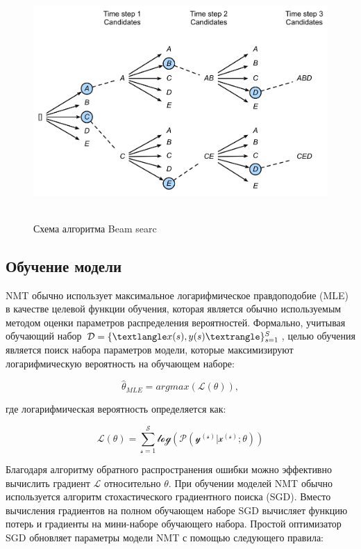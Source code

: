 	\begin{figure}[ht!]
		\centering
		\captionsetup{justification=centering}
		\includegraphics[height=90mm]{img/beam-search.png}
		\caption{Схема алгоритма Beam searc}
	\end{figure}
	
	
	\subsection{Обучение модели}
	
	NMT обычно использует максимальное логарифмическое правдоподобие (MLE) в качестве целевой функции обучения, которая является обычно используемым методом оценки параметров распределения вероятностей. Формально, учитывая обучающий набор $ \mathcal{D} = \{\textlangle x(s), y(s) \textrangle\}_{s=1}^S $, целью обучения является поиск набора параметров модели, которые максимизируют логарифмическую вероятность на обучающем наборе:
	
	$$
	    \hat{\theta}_{MLE} = argmax(\mathscr{L}(\theta)),
	$$

    где логарифмическая вероятность определяется как:
    
    $$
      \mathscr{L(\theta)=\sum_{s=1}^S log(P(y^{(s)}|x^{(s)};\theta))}  
    $$
    
    Благодаря алгоритму обратного распространения ошибки можно эффективно вычислить градиент $\mathscr{L}$ относительно $\theta$. При обучении моделей NMT обычно используется алгоритм стохастического градиентного поиска (SGD). Вместо вычисления градиентов на полном обучающем наборе SGD вычисляет функцию потерь и градиенты на мини-наборе обучающего набора. Простой оптимизатор SGD обновляет параметры модели NMT с помощью следующего правила:
    
